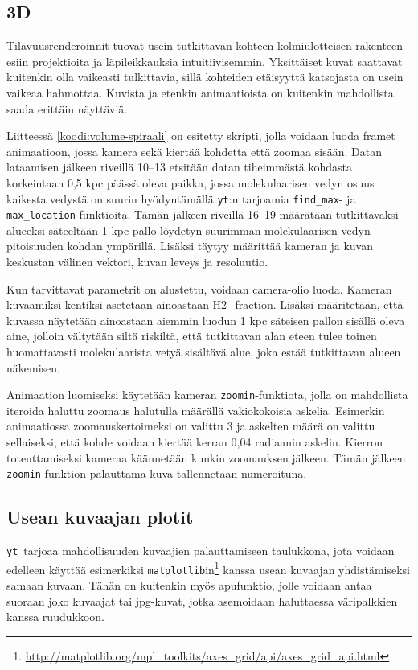 \documentclass[12pt,a4paper]{article}
\newcommand{\yt}{\texttt{yt}}
\begin{document}

\subsection{3D}
Tilavuusrenderöinnit tuovat usein tutkittavan kohteen kolmiulotteisen rakenteen esiin projektioita ja läpileikkauksia intuitiivisemmin. Yksittäiset kuvat saattavat kuitenkin olla vaikeasti tulkittavia, sillä kohteiden etäisyyttä katsojasta on usein vaikeaa hahmottaa. Kuvista ja etenkin animaatioista on kuitenkin mahdollista saada erittäin näyttäviä. 

Liitteessä \ref{koodi:volume-spiraali} on esitetty skripti, jolla voidaan luoda framet animaatioon, jossa kamera sekä kiertää kohdetta että zoomaa sisään. Datan lataamisen jälkeen riveillä 10--13 etsitään datan tiheimmästä kohdasta korkeintaan 0,5 kpc päässä oleva paikka, jossa molekulaarisen vedyn osuus kaikesta vedystä on suurin hyödyntämällä \yt :n tarjoamia \texttt{find\_max}- ja \texttt{max\_location}-funktioita. Tämän jälkeen riveillä 16--19 määrätään tutkittavaksi alueeksi säteeltään 1 kpc pallo löydetyn suurimman molekulaarisen vedyn pitoisuuden kohdan ympärillä. Lisäksi täytyy määrittää kameran ja kuvan keskustan välinen vektori, kuvan leveys ja resoluutio. 

Kun tarvittavat parametrit on alustettu, voidaan camera-olio luoda. Kameran kuvaamiksi kentiksi asetetaan ainoastaan H2\_fraction. Lisäksi määritetään, että kuvassa näytetään ainoastaan aiemmin luodun 1 kpc säteisen pallon sisällä oleva aine, jolloin vältytään siltä riskiltä, että tutkittavan alan eteen tulee toinen huomattavasti molekulaarista vetyä sisältävä alue, joka estää tutkittavan alueen näkemisen.

Animaation luomiseksi käytetään kameran \texttt{zoomin}-funktiota, jolla on mahdollista iteroida haluttu zoomaus halutulla määrällä vakiokokoisia askelia. Esimerkin animaatiossa zoomauskertoimeksi on valittu 3 ja askelten määrä on valittu sellaiseksi, että kohde voidaan kiertää kerran 0,04 radiaanin askelin. Kierron toteuttamiseksi kameraa käännetään kunkin zoomauksen jälkeen. Tämän jälkeen \texttt{zoomin}-funktion palauttama kuva tallennetaan numeroituna.


\subsection{Usean kuvaajan plotit}
\yt\ tarjoaa mahdollisuuden kuvaajien palauttamiseen taulukkona, jota voidaan edelleen käyttää esimerkiksi \texttt{matplotlib}in\footnote{\url{http://matplotlib.org/mpl_toolkits/axes_grid/api/axes_grid_api.html}} kanssa usean kuvaajan yhdistämiseksi samaan kuvaan. Tähän on kuitenkin myös apufunktio, jolle voidaan antaa suoraan joko kuvaajat tai jpg-kuvat, jotka asemoidaan haluttaessa väripalkkien kanssa ruudukkoon.
\end{document}
